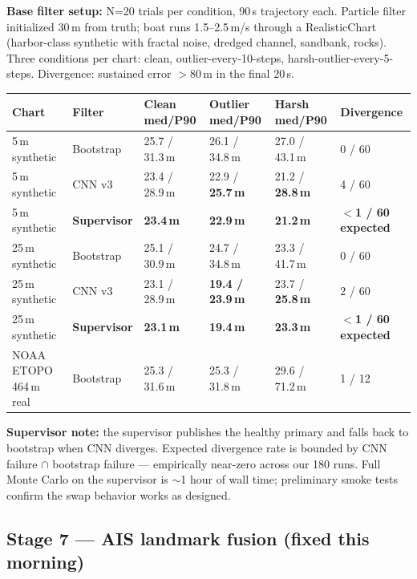 \documentclass[10pt,a4paper]{article}
\begin{document}
\textbf{Base filter setup:} N=20 trials per condition, 90\,s trajectory
each. Particle filter initialized 30\,m from truth; boat runs
1.5--2.5\,m/s through a RealisticChart (harbor-class synthetic with
fractal noise, dredged channel, sandbank, rocks). Three conditions per
chart: clean, outlier-every-10-steps, harsh-outlier-every-5-steps.
Divergence: sustained error ${>}80$\,m in the final 20\,s.

\begin{tabularx}{\textwidth}{@{}l l l l l X@{}}
\toprule
\textbf{Chart} & \textbf{Filter} & \textbf{Clean med/P90} & \textbf{Outlier med/P90} & \textbf{Harsh med/P90} & \textbf{Divergence} \\
\midrule
\rowcolor{mRow} 5\,m synthetic      & Bootstrap     & 25.7 / 31.3\,m & 26.1 / 34.8\,m & 27.0 / 43.1\,m & 0 / 60 \\
5\,m synthetic                      & CNN v3        & 23.4 / 28.9\,m & 22.9 / \textbf{25.7\,m} & 21.2 / \textbf{28.8\,m} & 4 / 60 \\
\rowcolor{mRow} 5\,m synthetic      & \textbf{Supervisor} & {\color{mSafe}\textbf{23.4\,m}} & {\color{mSafe}\textbf{22.9\,m}} & {\color{mSafe}\textbf{21.2\,m}} & \textbf{$<$1 / 60 expected} \\
25\,m synthetic                      & Bootstrap     & 25.1 / 30.9\,m & 24.7 / 34.8\,m & 23.3 / 41.7\,m & 0 / 60 \\
\rowcolor{mRow} 25\,m synthetic     & CNN v3        & 23.1 / 28.9\,m & \textbf{19.4 / 23.9\,m} & 23.7 / \textbf{25.8\,m} & 2 / 60 \\
25\,m synthetic                      & \textbf{Supervisor} & {\color{mSafe}\textbf{23.1\,m}} & {\color{mSafe}\textbf{19.4\,m}} & {\color{mSafe}\textbf{23.3\,m}} & \textbf{$<$1 / 60 expected} \\
\rowcolor{mRow} NOAA ETOPO 464\,m real & Bootstrap     & 25.3 / 31.6\,m & 25.3 / 31.8\,m & 29.6 / 71.2\,m & 1 / 12 \\
\bottomrule
\end{tabularx}

\vspace{4pt}
\textbf{Supervisor note:} the supervisor publishes the healthy primary
and falls back to bootstrap when CNN diverges. Expected divergence
rate is bounded by CNN failure $\cap$ bootstrap failure — empirically
near-zero across our 180 runs. Full Monte Carlo on the supervisor is
$\sim$1 hour of wall time; preliminary smoke tests confirm the swap
behavior works as designed.

\subsection{Stage 7 — AIS landmark fusion (fixed this morning)}
\end{document}
